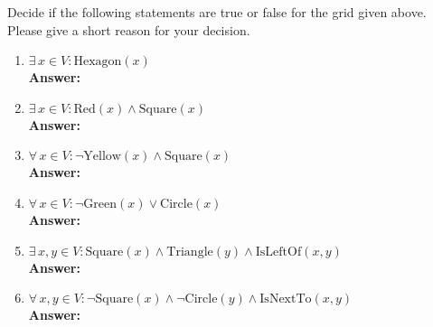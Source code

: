 \documentclass{exercise}
\newcommand{\answer}[1]{\vspace{0.25cm}\\\textbf{Answer:}~#1\vspace{0.25cm}}
\begin{document}
    Decide if the following statements are true or false for the grid given above. Please give a short reason for your decision.
    \begin{enumerate}
	    \item $\exists \, x \in V: \mathrm{Hexagon}(x)$
      \answer{

      }
	    
	    \item $\exists \, x \in V: \mathrm{Red}(x) \wedge \mathrm{Square}(x)$
      \answer{

      }
	    
	    \item $\forall \, x \in V: \neg \mathrm{Yellow}(x) \wedge \mathrm{Square}(x)$
      \answer{

      }
	    
	    \item $\forall \, x \in V: \neg \mathrm{Green}(x) \vee \mathrm{Circle}(x)$
      \answer{

      }
	    
	    \item $\exists \, x, y \in V: \mathrm{Square}(x) \wedge \mathrm{Triangle}(y) \wedge \mathrm{IsLeftOf}(x,y)$
      \answer{

      }
	    
	    \item $\forall \, x, y \in V: \neg \mathrm{Square}(x) \wedge \neg \mathrm{Circle}(y) \wedge \mathrm{IsNextTo}(x,y)$
      \answer{

      }
	    
    \end{enumerate}
\end{document}
